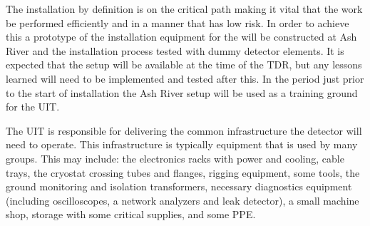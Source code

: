 The installation by definition is on the critical path making it vital
that the work be performed efficiently and in a manner that has low
risk. In order to achieve this a prototype of the installation
equipment for the   will be constructed at Ash River and the installation
process tested with dummy detector elements. It is expected that the
setup will be available at the time of the TDR, but any lessons
learned will need to be implemented and tested after this. In the
period just prior to the start of installation the Ash River setup
will be used as a training ground for the UIT.

The UIT is responsible for delivering the common infrastructure
the detector will need to operate. This infrastructure is typically
equipment that is used by many groups. This may include: the
electronics racks with power and cooling, cable trays, the cryostat
crossing tubes and flanges, rigging equipment, some tools, the ground
monitoring and isolation transformers, necessary diagnostics equipment
(including oscilloscopes, a network analyzers and leak detector), a
small machine shop, storage with some critical supplies, and some PPE.



